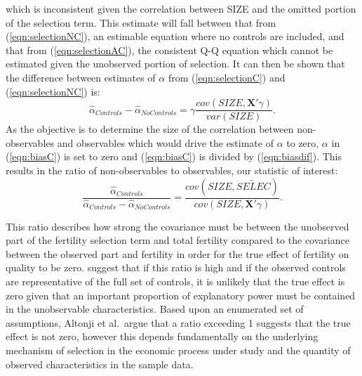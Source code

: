 \documentclass{article}[11pt,subeqn]
\newcommand{\vect}[1]{\mathbf{#1}}
\begin{document}
\begin{spacing}{1.5}
which is inconsistent given the correlation between SIZE and the omitted portion of the selection term.  This estimate will fall between that from (\ref{eqn:selectionNC}), an estimable equation where
no controls are included, and that from (\ref{eqn:selectionAC}), the consistent Q-Q equation which cannot be estimated given the unobserved portion of selection.  It can then be shown that the
difference between estimates of $\alpha$ from (\ref{eqn:selectionC}) and (\ref{eqn:selectionNC}) is:
\begin{equation}
 \label{eqn:biasdif}
\hat\alpha_{Controls} - \hat\alpha_{NoControls} = \gamma\frac{cov(SIZE,\vect{X}'\gamma)}{var(SIZE)}.
\end{equation}
As the objective is to determine the size of the correlation between non-observables and observables which would drive the estimate of $\alpha$ to zero, $\alpha$ in (\ref{eqn:biasC})
is set to zero and (\ref{eqn:biasC}) is divided by (\ref{eqn:biasdif}).  This results in the ratio of non-observables to observables, our statistic of interest:
\begin{equation}
 \label{eqn:Aratio}
\frac{\hat\alpha_{Controls}}{\hat\alpha_{Controls} - \hat\alpha_{NoControls}}=\frac{cov(SIZE,\widetilde{SELEC})}{cov(SIZE,\vect{X}'\gamma)}.
\end{equation}

This ratio describes how strong the covariance must be between the unobserved part of the fertility selection term and total fertility compared to the covariance between the observed
part and fertility in order for the true effect of fertility on quality to be zero.  \citet{Altonjietal2005} suggest that if this ratio is high and if the observed controls are
representative of the full set of controls, it is unlikely that the true effect is zero given that an important proportion of explanatory power must be contained in the unobservable 
characteristics.  Based upon an enumerated set of assumptions, Altonji et al.\ argue that a ratio exceeding 1 suggests that the true effect is not zero, however this depends 
fundamentally on the underlying mechanism of selection in the economic process under study and the quantity of observed characteristics in the sample data.


\end{spacing}
\end{document}
